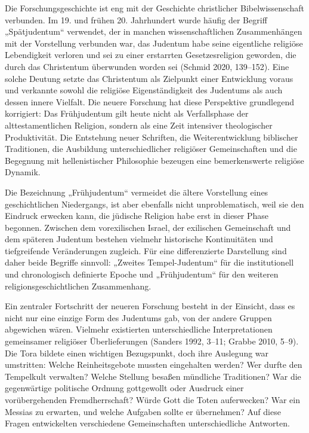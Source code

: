 \documentclass[fontsize=12pt]{mybib}
\begin{document}
Die Forschungsgeschichte ist eng mit der Geschichte christlicher Bibelwissenschaft verbunden. Im 19. und frühen 20. Jahrhundert wurde häufig der Begriff „Spätjudentum“ verwendet, der in manchen wissenschaftlichen Zusammenhängen mit der Vorstellung verbunden war, das Judentum habe seine eigentliche religiöse Lebendigkeit verloren und sei zu einer erstarrten Gesetzesreligion geworden, die durch das Christentum überwunden worden sei (Schmid 2020, 139–152). Eine solche Deutung setzte das Christentum als Zielpunkt einer Entwicklung voraus und verkannte sowohl die religiöse Eigenständigkeit des Judentums als auch dessen innere Vielfalt. Die neuere Forschung hat diese Perspektive grundlegend korrigiert: Das Frühjudentum gilt heute nicht als Verfallsphase der alttestamentlichen Religion, sondern als eine Zeit intensiver theologischer Produktivität. Die Entstehung neuer Schriften, die Weiterentwicklung biblischer Traditionen, die Ausbildung unterschiedlicher religiöser Gemeinschaften und die Begegnung mit hellenistischer Philosophie bezeugen eine bemerkenswerte religiöse Dynamik.

Die Bezeichnung „Frühjudentum“ vermeidet die ältere Vorstellung eines geschichtlichen Niedergangs, ist aber ebenfalls nicht unproblematisch, weil sie den Eindruck erwecken kann, die jüdische Religion habe erst in dieser Phase begonnen. Zwischen dem vorexilischen Israel, der exilischen Gemeinschaft und dem späteren Judentum bestehen vielmehr historische Kontinuitäten und tiefgreifende Veränderungen zugleich. Für eine differenzierte Darstellung sind daher beide Begriffe sinnvoll: „Zweites Tempel-Judentum“ für die institutionell und chronologisch definierte Epoche und „Frühjudentum“ für den weiteren religionsgeschichtlichen Zusammenhang.

Ein zentraler Fortschritt der neueren Forschung besteht in der Einsicht, dass es nicht nur eine einzige Form des Judentums gab, von der andere Gruppen abgewichen wären. Vielmehr existierten unterschiedliche Interpretationen gemeinsamer religiöser Überlieferungen (Sanders 1992, 3–11; Grabbe 2010, 5–9). Die Tora bildete einen wichtigen Bezugspunkt, doch ihre Auslegung war umstritten: Welche Reinheitsgebote mussten eingehalten werden? Wer durfte den Tempelkult verwalten? Welche Stellung besaßen mündliche Traditionen? War die gegenwärtige politische Ordnung gottgewollt oder Ausdruck einer vorübergehenden Fremdherrschaft? Würde Gott die Toten auferwecken? War ein Messias zu erwarten, und welche Aufgaben sollte er übernehmen? Auf diese Fragen entwickelten verschiedene Gemeinschaften unterschiedliche Antworten.
\end{document}
